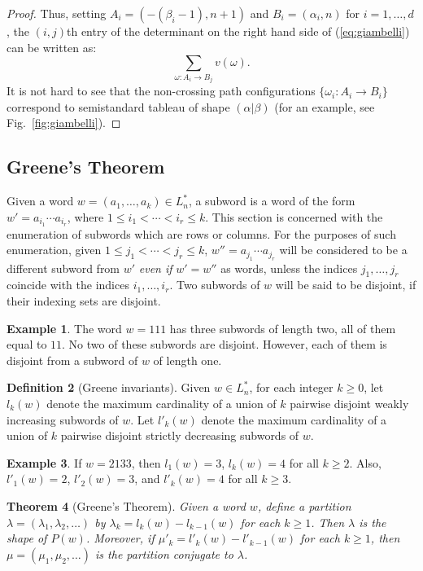 \documentclass[11pt]{amsproc}
\newtheorem{theorem}{Theorem}[subsection]
\theoremstyle{definition}
\newtheorem{definition}[theorem]{Definition}
\theoremstyle{example}
\newtheorem{example}[theorem]{Example}
\begin{document}
\begin{proof}
  Thus, setting $A_i=(-(\beta_i-1),n+1)$ and $B_i=(\alpha_i,n)$ for $i=1,\dotsc,d$, 
  the $(i,j)$th entry of the determinant on the right hand side of (\ref{eq:giambelli}) can be written as:
  \begin{equation}
    \label{eq:giambelli-det}
    \sum_{\omega:A_i\to B_j} v(\omega).
  \end{equation}
  It is not hard to see that the non-crossing path configurations $\{\omega_i:A_i\to B_i\}$ correspond to semistandard tableau of shape $(\alpha|\beta)$ (for an example, see Fig.~\ref{fig:giambelli}).
\end{proof}
\subsection{Greene's Theorem}
\label{sec:greenes-theorem}
Given a word $w = (a_1,\dotsc,a_k)\in L_n^*$, a subword is a word of the form $w' = a_{i_1}\dotsb a_{i_r}$, where $1\leq i_1<\dotsb < i_r\leq k$.
This section is concerned with the enumeration of subwords which are rows or columns.
For the purposes of such enumeration, given $1 \leq j_1<\dotsb <j_r\leq k$, $w'' = a_{j_1}\dotsb a_{j_r}$ will be considered to be a different subword from $w'$ \emph{even if} $w'=w''$ as words, unless the indices $j_1,\dotsc, j_r$ coincide with the indices $i_1,\dotsc,i_r$.
Two subwords of $w$ will be said to be disjoint, if their indexing sets are disjoint.
\begin{example}
  The word $w=111$ has three subwords of length two, all of them equal to $11$.
  No two of these subwords are disjoint.
  However, each of them is disjoint from a subword of $w$ of length one.
\end{example}
\begin{definition}
  [Greene invariants]
  \label{definition:Greene-invars}
  Given $w \in L_n^*$, for each integer $k\geq 0$, let $l_k(w)$ denote the maximum cardinality of a union of $k$ pairwise disjoint weakly increasing subwords of $w$.
  Let $l'_k(w)$ denote the maximum cardinality of a union of $k$ pairwise disjoint strictly decreasing subwords of $w$.
\end{definition}
\begin{example}
  If $w=2133$, then $l_1(w)=3$, $l_k(w)=4$ for all $k\geq 2$.
  Also, $l'_1(w) = 2$, $l'_2(w)=3$, and $l'_k(w)=4$ for all $k\geq 3$.
\end{example}
\begin{theorem}
  [Greene's Theorem]
  \label{theorem:Greene}
  Given a word $w$, define a partition $\lambda=(\lambda_1,\lambda_2,\dotsc)$ by $\lambda_k=l_k(w)-l_{k-1}(w)$ for each $k\geq 1$.
  Then $\lambda$ is the shape of $P(w)$.
  Moreover, if $\mu'_k=l'_k(w)-l'_{k-1}(w)$ for each $k\geq 1$, then $\mu=(\mu_1,\mu_2,\dotsc)$ is the partition conjugate to $\lambda$.
\end{theorem}
\end{document}

